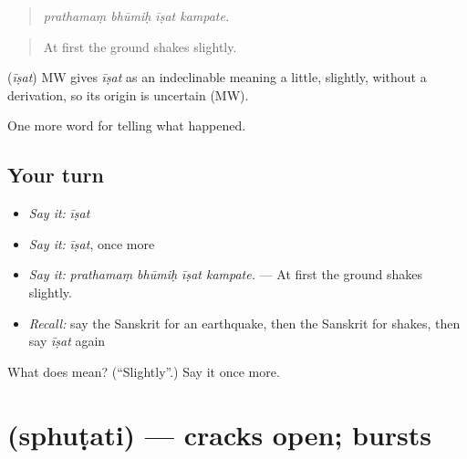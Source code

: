 \begin{quote}
   
\end{quote}

\begin{quote}
\emph{prathamaṃ bhūmiḥ īṣat kampate.}
\end{quote}

\begin{quote}
At first the ground shakes slightly.
\end{quote}

\begin{cousinweb}
\textbf{} (\emph{īṣat}) MW gives \emph{īṣat} as an indeclinable meaning a little, slightly, without a derivation, so its origin is uncertain (MW).
\end{cousinweb}

\begin{grammarlens}[title={What you've built}]
One more word for telling what happened.
\end{grammarlens}

\subsection*{Your turn}
\begin{itemize}
\raggedright
  \item \emph{Say it:} \emph{īṣat}
  \item \emph{Say it:} \emph{īṣat}, once more
  \item \emph{Say it:} \emph{prathamaṃ bhūmiḥ īṣat kampate.} — At first the ground shakes slightly.
  \item \emph{Recall:} say the Sanskrit for an earthquake, then the Sanskrit for shakes, then say \emph{īṣat} again
\end{itemize}

\begin{tcolorbox}[breakable,colback=teal!4,colframe=teal!35!black,title={Before you move on}]
What does  mean? (\textquotedblleft{}Slightly\textquotedblright{}.) Say it once more.
\end{tcolorbox}
\section[\texorpdfstring{\sk{स्फुटति} (sphuṭati)}{स्फुटति (sphuṭati)}]{ (sphuṭati) — cracks open; bursts}

\label{lesson:SA-C300-sphutati}



